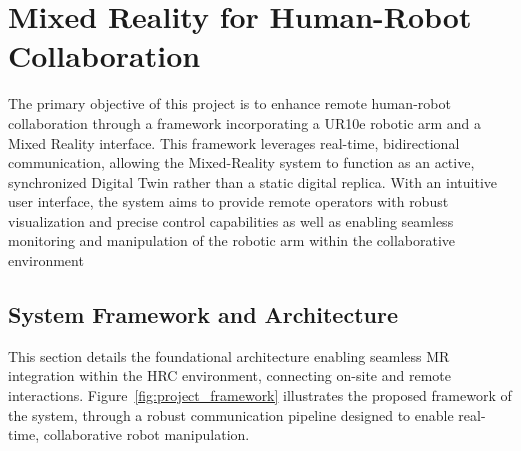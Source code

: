 \chapter{Mixed Reality for Human-Robot Collaboration}
\label{chapter:on-site}

\begin{introduction}
    The primary objective of this project is to enhance remote human-robot collaboration through a framework incorporating a UR10e robotic arm and a Mixed Reality interface. This framework leverages real-time, bidirectional communication, allowing the Mixed-Reality system to function as an active, synchronized Digital Twin rather than a static digital replica. With an intuitive user interface, the system aims to provide remote operators with robust visualization and precise control capabilities as well as enabling seamless monitoring and manipulation of the robotic arm within the collaborative environment

\end{introduction}


\section{System Framework and Architecture}

This section details the foundational architecture enabling seamless \ac{MR} integration within the \ac{HRC} environment, connecting on-site and remote interactions. Figure~\ref{fig:project_framework} illustrates the proposed framework of the system, through a robust communication pipeline designed to enable real-time, collaborative robot manipulation.

